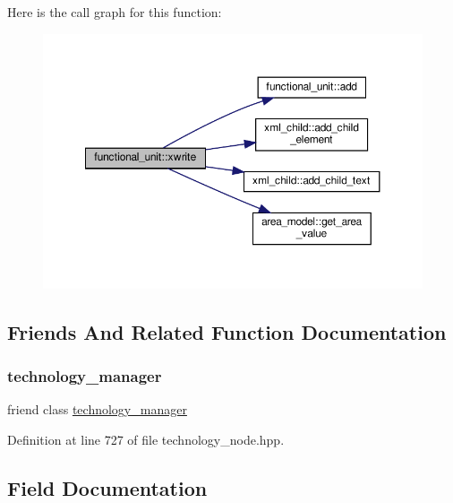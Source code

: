 Here is the call graph for this function\+:
\nopagebreak
\begin{figure}[H]
\begin{center}
\leavevmode
\includegraphics[width=350pt]{d8/dd6/structfunctional__unit_a49837b741da6b92962511fc1d3d20ff0_cgraph}
\end{center}
\end{figure}


\subsection{Friends And Related Function Documentation}
\mbox{\label{structfunctional__unit_a7012231228df7578c7338a9773121f88}} 
\subsubsection{\texorpdfstring{technology\+\_\+manager}{technology\_manager}}
{\footnotesize\ttfamily friend class \hyperlink{classtechnology__manager}{technology\+\_\+manager}\hspace{0.3cm}{\ttfamily [friend]}}



Definition at line 727 of file technology\+\_\+node.\+hpp.



\subsection{Field Documentation}
\mbox{\label{structfunctional__unit_a8ffb95d2339f1482194eeaa2bd3f7242}} 
